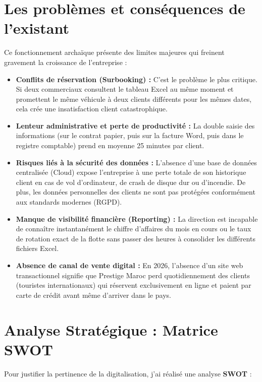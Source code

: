 \documentclass[12pt, a4paper]{report}
\begin{document}
\section{Les problèmes et conséquences de l'existant}
Ce fonctionnement archaïque présente des limites majeures qui freinent gravement la croissance de l'entreprise :
\begin{itemize}
    \item \textbf{Conflits de réservation (Surbooking) :} C'est le problème le plus critique. Si deux commerciaux consultent le tableau Excel au même moment et promettent le même véhicule à deux clients différents pour les mêmes dates, cela crée une insatisfaction client catastrophique.
    \item \textbf{Lenteur administrative et perte de productivité :} La double saisie des informations (sur le contrat papier, puis sur la facture Word, puis dans le registre comptable) prend en moyenne 25 minutes par client.
    \item \textbf{Risques liés à la sécurité des données :} L'absence d'une base de données centralisée (Cloud) expose l'entreprise à une perte totale de son historique client en cas de vol d'ordinateur, de crash de disque dur ou d'incendie. De plus, les données personnelles des clients ne sont pas protégées conformément aux standards modernes (RGPD).
    \item \textbf{Manque de visibilité financière (Reporting) :} La direction est incapable de connaître instantanément le chiffre d'affaires du mois en cours ou le taux de rotation exact de la flotte sans passer des heures à consolider les différents fichiers Excel.
    \item \textbf{Absence de canal de vente digital :} En 2026, l'absence d'un site web transactionnel signifie que Prestige Maroc perd quotidiennement des clients (touristes internationaux) qui réservent exclusivement en ligne et paient par carte de crédit avant même d'arriver dans le pays.
\end{itemize}

\section{Analyse Stratégique : Matrice SWOT}
Pour justifier la pertinence de la digitalisation, j'ai réalisé une analyse \textbf{SWOT} :
\end{document}
